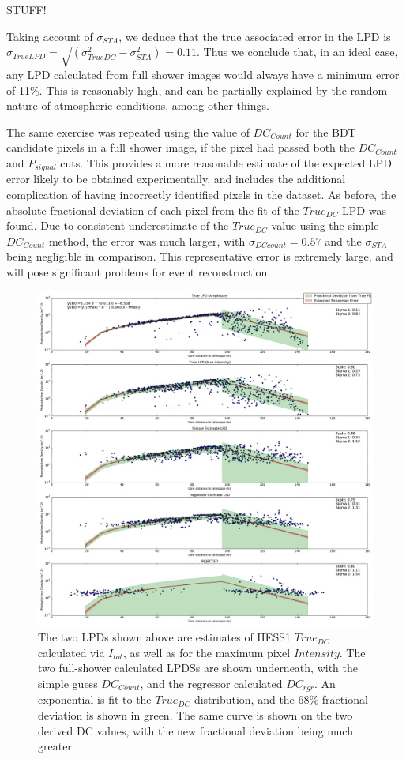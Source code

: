 \documentclass{article}
\begin{document}
STUFF!

Taking account of $\sigma_{STA}$, we deduce that the true associated error in the LPD is $\sigma_{TrueLPD} = \sqrt{(\sigma_{TrueDC}^{2} - \sigma_{STA}^{2})} = 0.11$. Thus we conclude that, in an ideal case, any LPD calculated from full shower images would always have a minimum error of 11\%. This is reasonably high, and can be partially explained by the random nature of atmospheric conditions, among other things.

The same exercise was repeated using the value of $DC_{Count}$ for the BDT candidate pixels in a full shower image, if the pixel had passed both the $DC_{Count}$ and $P_{signal}$ cuts. This provides a more reasonable estimate of the expected LPD error likely to be obtained experimentally, and includes the additional complication of having incorrectly identified pixels in the dataset. As before, the absolute fractional deviation of each pixel from the fit of the $True_{DC}$ LPD was found. Due to consistent underestimate of the $True_{DC}$ value using the simple $DC_{Count}$ method, the error was much larger, with $\sigma_{DCcount}=0.57$ and the $\sigma_{STA}$ being negligible in comparison. This representative error is extremely large, and will pose significant problems for event reconstruction.

\begin{figure}
\begin{center}
\includegraphics[width=\textwidth]{corsikalpd1}
\caption{The two LPDs shown above are estimates of HESS1 $True_{DC}$ calculated via $I_{tot}$, as well as for the maximum pixel $Intensity$. The two full-shower calculated LPDSs are shown underneath, with the simple guess $DC_{Count}$, and the regressor calculated $DC_{rgr}$. An exponential is fit to the $True_{DC}$ distribution, and the 68\% fractional deviation is shown in green. The same curve is shown on the two derived DC values, with the new fractional deviation being much greater.}
\label{fig:corsikalpd1}
\end{center}
\end{figure}
\end{document}
